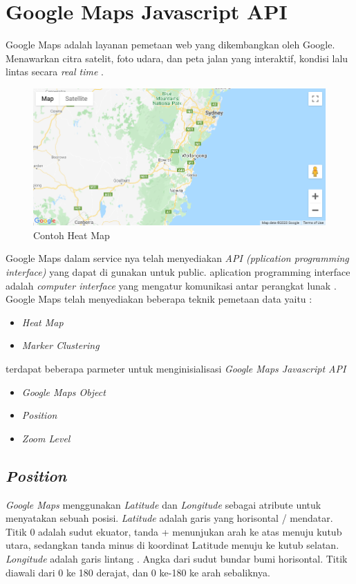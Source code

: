 \section{Google Maps Javascript API}
\label{sec:googlemaps}
Google Maps adalah layanan pemetaan web yang dikembangkan oleh Google. Menawarkan citra satelit, foto udara, dan peta jalan yang interaktif, kondisi lalu lintas secara \textit{real time} \cite{mehta:19:gmaps}.
 \begin{figure}[H]
    \centering
    \includegraphics[scale=0.5]{Gambar/example_google_map.PNG}
    \caption{Contoh Heat Map }
    \label{fig:my_label}
\end{figure}
Google Maps dalam service nya telah menyediakan \textit{API (pplication programming interface)} yang dapat di gunakan untuk public.
aplication programming interface adalah \textit{computer interface} yang mengatur komunikasi antar perangkat lunak \cite{libby:20:api}.
Google Maps telah menyediakan beberapa teknik pemetaan data yaitu :
 \begin{itemize}
     \item \textit{Heat Map}
     \item \textit{Marker Clustering}

 \end{itemize}
 terdapat beberapa parmeter untuk menginisialisasi \textit{Google Maps Javascript API}
 \begin{itemize}
     \item \textit{Google Maps Object}
     \item \textit{Position}
     \item \textit{Zoom Level}
 \end{itemize}
 
 \subsection{\textit{Position}}
 \textit{Google Maps} menggunakan \textit{Latitude} dan \textit{Longitude}  sebagai atribute untuk menyatakan sebuah posisi.
 \textit{Latitude} adalah garis yang horisontal / mendatar. Titik 0 adalah sudut ekuator, tanda + menunjukan arah ke atas menuju kutub utara, sedangkan tanda minus di koordinat Latitude menuju ke kutub selatan. \textit{Longitude} adalah garis lintang . Angka dari sudut bundar bumi horisontal. Titik diawali dari 0 ke 180 derajat, dan 0 ke-180 ke arah sebaliknya.
 
